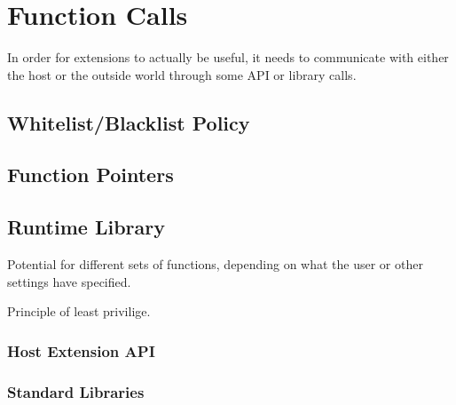 \chapter {Function Calls}

In order for extensions to actually be useful, it needs to communicate with
either the host or the outside world through some API or library calls.


\section {Whitelist/Blacklist Policy}


\section {Function Pointers}


\section {Runtime Library}

Potential for different sets of functions, depending on what the user or other
settings have specified.

Principle of least privilige.

\subsection {Host Extension API}

\subsection {Standard Libraries}

